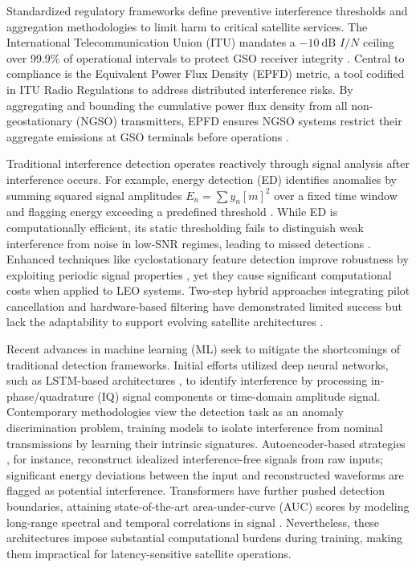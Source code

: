 \documentclass[conference]{IEEEtran}
\begin{document}
Standardized regulatory frameworks define preventive interference thresholds and aggregation methodologies to limit harm to critical satellite services. The International Telecommunication Union (ITU) mandates a $-10~\text{dB}$ $I / N$ ceiling over 99.9\% of operational intervals to protect GSO receiver integrity \cite{itur2017ProtectionCriteriaOperation}. Central to compliance is the Equivalent Power Flux Density (EPFD) metric, a tool codified in ITU Radio Regulations to address distributed interference risks. By aggregating and bounding the cumulative power flux density from all non-geostationary (NGSO) transmitters, EPFD ensures NGSO systems restrict their aggregate emissions at GSO terminals before operations \cite{itur2002AggregateDownlinkEquivalent}.

Traditional interference detection operates reactively through signal analysis after interference occurs. For example, energy detection (ED) identifies anomalies by summing squared signal amplitudes $E_{n } = \sum y_n[m]^{2}$ over a fixed time window and flagging energy exceeding a predefined threshold \cite{kay2009fundamentals}. While ED is computationally efficient, its static thresholding fails to distinguish weak interference from noise in low-SNR regimes, leading to missed detections  \cite{saifaldawlaGenAIBasedModelsNGSO2024}. Enhanced techniques like cyclostationary feature detection improve robustness by exploiting periodic signal properties \cite{experimentalCyclostationary}, yet they cause significant computational costs when applied to LEO systems. Two-step hybrid approaches integrating pilot cancellation and hardware-based filtering have demonstrated limited success but lack the adaptability to support evolving satellite architectures \cite{wangCoFrequencyInterferenceAnalysis2020}.

Recent advances in machine learning (ML) seek to mitigate the shortcomings of traditional detection frameworks. Initial efforts utilized deep neural networks, such as  LSTM-based architectures \cite{pellacoSpectrumPredictionInterference2019}, to identify interference by processing in-phase/quadrature (IQ) signal components or time-domain amplitude signal. Contemporary methodologies view the detection task as an anomaly discrimination problem, training models to isolate interference from nominal transmissions by learning their intrinsic signatures. Autoencoder-based strategies \cite{saifaldawlaConvolutionalAutoencodersNonGeostationary2024}, for instance, reconstruct idealized interference-free signals from raw inputs; significant energy deviations between the input and reconstructed waveforms are flagged as potential interference. Transformers have further pushed detection boundaries, attaining state-of-the-art area-under-curve (AUC) scores by modeling long-range spectral and temporal correlations in signal \cite{saifaldawlaGenAIBasedModelsNGSO2024}. Nevertheless, these architectures impose substantial computational burdens during training, making them impractical for latency-sensitive satellite operations.
\end{document}

